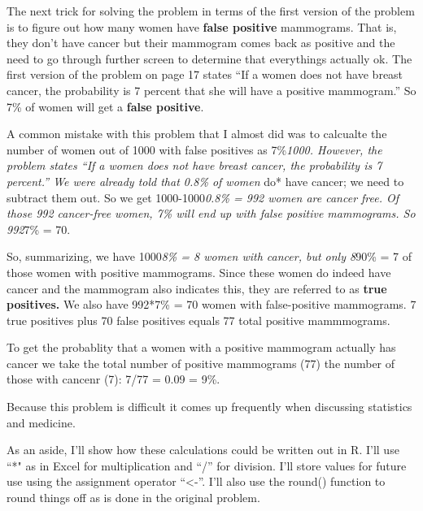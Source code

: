 \documentclass[]{book}
\newenvironment{Shaded}{\begin{snugshade}}{\end{snugshade}}
\newcommand{\DecValTok}[1]{\textcolor[rgb]{0.00,0.00,0.81}{#1}}
\newcommand{\FloatTok}[1]{\textcolor[rgb]{0.00,0.00,0.81}{#1}}
\newcommand{\StringTok}[1]{\textcolor[rgb]{0.31,0.60,0.02}{#1}}
\newcommand{\CommentTok}[1]{\textcolor[rgb]{0.56,0.35,0.01}{\textit{#1}}}
\newcommand{\OperatorTok}[1]{\textcolor[rgb]{0.81,0.36,0.00}{\textbf{#1}}}
\newcommand{\NormalTok}[1]{#1}
\theoremstyle{definition}
\theoremstyle{definition}
\theoremstyle{definition}
\theoremstyle{remark}
\begin{document}
The next trick for solving the problem in terms of the first version of
the problem is to figure out how many women have \textbf{false positive}
mammograms. That is, they don't have cancer but their mammogram comes
back as positive and the need to go through further screen to determine
that everythings actually ok. The first version of the problem on page
17 states ``If a women does not have breast cancer, the probability is 7
percent that she will have a positive mammogram.'' So 7\% of women will
get a \textbf{false positive}.

A common mistake with this problem that I almost did was to calcualte
the number of women out of 1000 with false positives as 7\%\emph{1000.
However, the problem states ``If a women does not have breast cancer,
the probability is 7 percent.'' We were already told that 0.8\% of women
}do* have cancer; we need to subtract them out. So we get
1000-1000\emph{0.8\% = 992 women are cancer free. Of those 992
cancer-free women, 7\% will end up with false positive mammograms. So
992}7\% = 70.

So, summarizing, we have 1000\emph{8\% = 8 women with cancer, but only
8}90\% = 7 of those women with positive mammograms. Since these women do
indeed have cancer and the mammogram also indicates this, they are
referred to as \textbf{true positives.} We also have 992*7\% = 70 women
with false-positive mammograms. 7 true positives plus 70 false positives
equals 77 total positive mammmograms.

To get the probablity that a women with a positive mammogram actually
has cancer we take the total number of positive mammograms (77) the
number of those with cancenr (7): 7/77 = 0.09 = 9\%.

Because this problem is difficult it comes up frequently when discussing
statistics and medicine.

As an aside, I'll show how these calculations could be written out in R.
I'll use ``*" as in Excel for multiplication and ``/'' for division.
I'll store values for future use using the assignment operator
``\textless{}-''. I'll also use the round() function to round things off
as is done in the original problem.

\begin{Shaded}
\end{Shaded}
\end{document}
